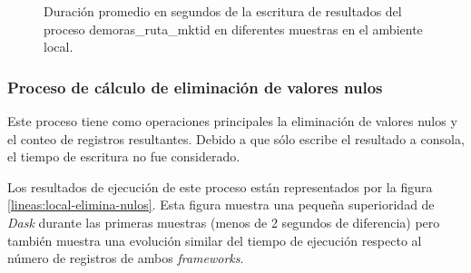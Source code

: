 \begin{figure}
\centering
{}
\caption{Duración promedio en segundos de la escritura de resultados del proceso demoras\_ruta\_mktid en diferentes muestras en el ambiente local.}
\label{lineas:local-demoras-ruta-mktid-write}
\end{figure}

\subsubsection{Proceso de cálculo de eliminación de valores nulos}

Este proceso tiene como operaciones principales la eliminación de valores nulos y el conteo de registros resultantes. Debido a que sólo escribe el resultado a consola, el tiempo de escritura no fue considerado.

Los resultados de ejecución de este proceso están representados por la figura \ref{lineas:local-elimina-nulos}. Esta figura muestra una pequeña superioridad de \textit{Dask} durante las primeras muestras (menos de 2 segundos de diferencia) pero también muestra una evolución similar del tiempo de ejecución respecto al número de registros de ambos \textit{frameworks}. 

